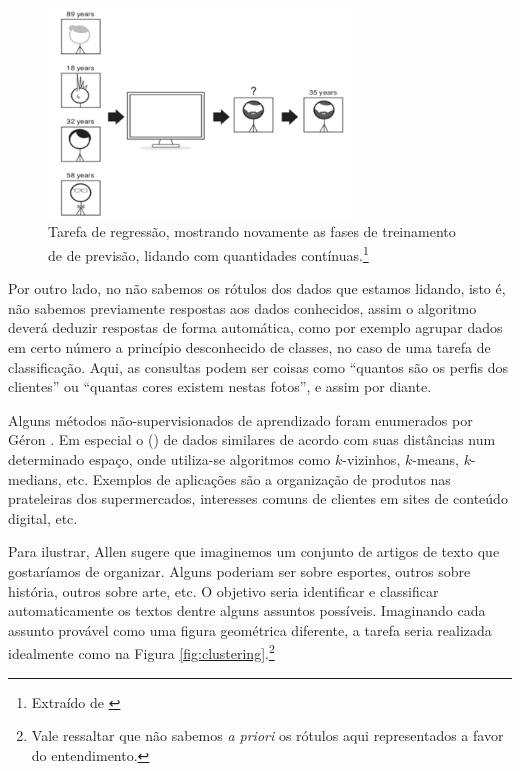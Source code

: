 \begin{figure}[htb]
\centering
\includegraphics[width=8cm]{figuras/regressao}
\caption{Tarefa de regressão, mostrando novamente as fases de treinamento de de previsão, lidando com quantidades contínuas.\footnote{Extraído de \citep{allen}}}
\label{fig:regressao}
\end{figure}

Por outro lado, no  não sabemos os rótulos dos dados que estamos lidando, isto é, não sabemos previamente respostas aos dados conhecidos, assim o algoritmo deverá deduzir respostas de forma automática, como por exemplo agrupar dados em certo número a princípio desconhecido de classes, no caso de uma tarefa de classificação. Aqui, as consultas podem ser coisas como ``quantos são os perfis dos clientes'' ou ``quantas cores existem nestas fotos'', e assim por diante.

Alguns métodos não-supervisionados de aprendizado foram enumerados por Géron \citep{hands}. Em especial o  () de dados similares de acordo com suas distâncias num determinado espaço, onde utiliza-se algoritmos como $k$-vizinhos, $k$-means, $k$-medians, etc. Exemplos de aplicações são a organização de produtos nas prateleiras dos supermercados, interesses comuns de clientes em sites de conteúdo digital, etc.

Para ilustrar, Allen \citep{allen} sugere que imaginemos um conjunto de artigos de texto que gostaríamos de organizar. Alguns poderiam ser sobre esportes, outros sobre história, outros sobre arte, etc. O objetivo seria identificar e classificar automaticamente os textos dentre alguns assuntos possíveis. Imaginando cada assunto provável como uma figura geométrica diferente, a tarefa seria realizada idealmente como na Figura \ref{fig:clustering}.\footnote{Vale ressaltar que não sabemos \emph{a priori} os rótulos aqui representados a favor do entendimento.}

